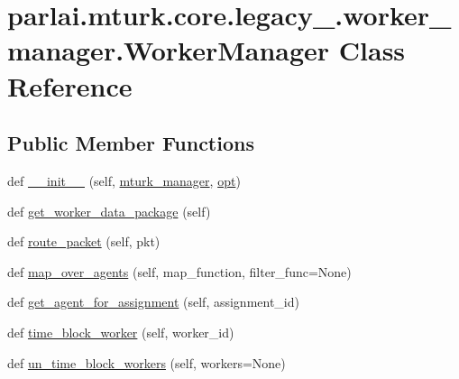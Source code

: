 \hypertarget{classparlai_1_1mturk_1_1core_1_1legacy__2018_1_1worker__manager_1_1WorkerManager}{}\section{parlai.\+mturk.\+core.\+legacy\+\_.\+worker\+\_\+manager.\+Worker\+Manager Class Reference}
\label{classparlai_1_1mturk_1_1core_1_1legacy__2018_1_1worker__manager_1_1WorkerManager}
\subsection*{Public Member Functions}
\begin{DoxyCompactItemize}
\item 
def \hyperlink{classparlai_1_1mturk_1_1core_1_1legacy__2018_1_1worker__manager_1_1WorkerManager_a24fab1ac6f3e46ac7e819cc2159cbd5b}{\+\_\+\+\_\+init\+\_\+\+\_\+} (self, \hyperlink{classparlai_1_1mturk_1_1core_1_1legacy__2018_1_1worker__manager_1_1WorkerManager_a12d2994adc934a5e06f73c89db795b31}{mturk\+\_\+manager}, \hyperlink{classparlai_1_1mturk_1_1core_1_1legacy__2018_1_1worker__manager_1_1WorkerManager_a5ded59b0eaf47582110862cc1b8b379e}{opt})
\item 
def \hyperlink{classparlai_1_1mturk_1_1core_1_1legacy__2018_1_1worker__manager_1_1WorkerManager_ab86707310cf5c8bc79dc9aae56bae44d}{get\+\_\+worker\+\_\+data\+\_\+package} (self)
\item 
def \hyperlink{classparlai_1_1mturk_1_1core_1_1legacy__2018_1_1worker__manager_1_1WorkerManager_aa74b0ed37c36bb2351e2688b4347c3fa}{route\+\_\+packet} (self, pkt)
\item 
def \hyperlink{classparlai_1_1mturk_1_1core_1_1legacy__2018_1_1worker__manager_1_1WorkerManager_a8ad270c9bc69faf5e24dd2144f0635d4}{map\+\_\+over\+\_\+agents} (self, map\+\_\+function, filter\+\_\+func=None)
\item 
def \hyperlink{classparlai_1_1mturk_1_1core_1_1legacy__2018_1_1worker__manager_1_1WorkerManager_ab0fb35b45a7c64d79e9a2f61479fcf8b}{get\+\_\+agent\+\_\+for\+\_\+assignment} (self, assignment\+\_\+id)
\item 
def \hyperlink{classparlai_1_1mturk_1_1core_1_1legacy__2018_1_1worker__manager_1_1WorkerManager_ae4a79610f990f2b850132f503b9e68f9}{time\+\_\+block\+\_\+worker} (self, worker\+\_\+id)
\item 
def \hyperlink{classparlai_1_1mturk_1_1core_1_1legacy__2018_1_1worker__manager_1_1WorkerManager_a0a2d5c732277ccc7fa9a774aa0137aaa}{un\+\_\+time\+\_\+block\+\_\+workers} (self, workers=None)

\end{DoxyCompactItemize}
